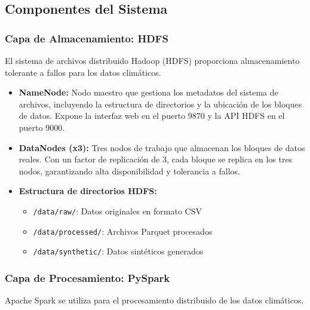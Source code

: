 \documentclass[12pt,a4paper]{scrartcl}
\begin{document}
\subsection{Componentes del Sistema}

\subsubsection{Capa de Almacenamiento: HDFS}

El sistema de archivos distribuido Hadoop (HDFS) proporciona almacenamiento tolerante a fallos para los datos climáticos.

\begin{itemize}
    \item \textbf{NameNode:} Nodo maestro que gestiona los metadatos del sistema de archivos, incluyendo la estructura de directorios y la ubicación de los bloques de datos. Expone la interfaz web en el puerto 9870 y la API HDFS en el puerto 9000.
    
    \item \textbf{DataNodes (x3):} Tres nodos de trabajo que almacenan los bloques de datos reales. Con un factor de replicación de 3, cada bloque se replica en los tres nodos, garantizando alta disponibilidad y tolerancia a fallos.
    
    \item \textbf{Estructura de directorios HDFS:}
    \begin{itemize}
        \item \texttt{/data/raw/}: Datos originales en formato CSV
        \item \texttt{/data/processed/}: Archivos Parquet procesados
        \item \texttt{/data/synthetic/}: Datos sintéticos generados
    \end{itemize}
\end{itemize}

\subsubsection{Capa de Procesamiento: PySpark}

Apache Spark se utiliza para el procesamiento distribuido de los datos climáticos.
\end{document}
